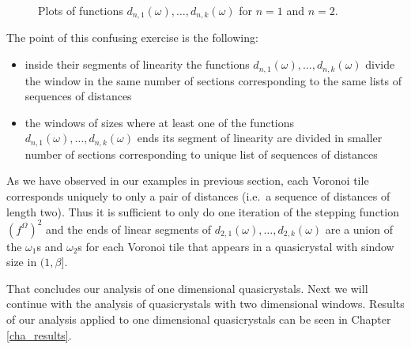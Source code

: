 \documentclass[text.tex]{subfiles}
\begin{document}
\begin{figure}[h!]
\caption{Plots of functions $d_{n,1}(\omega),\dots, d_{n,k}(\omega)$ for $n=1$ and $n=2$. }
\label{fig_steppingFunctionDiscontinuityFunctions}
\end{figure}


The point of this confusing exercise is the following: 
\begin{itemize}
\item inside their segments of linearity the functions $d_{n,1}(\omega),\dots, d_{n,k}(\omega)$ divide the window in the same number of sections corresponding to the same lists of sequences of distances 
\item the windows of sizes where at least one of the functions $d_{n,1}(\omega),\dots, d_{n,k}(\omega)$ ends its segment of linearity are divided in smaller number of sections corresponding to unique list of sequences of distances
\end{itemize} 

As we have observed in our examples in previous section, each Voronoi tile corresponds uniquely to only a pair of distances (i.e.\ a sequence of distances of length two). Thus it is sufficient to only do one iteration of the stepping function $(f^\Omega)^2$ and the ends of linear segments of $d_{2,1}(\omega),\dots, d_{2,k}(\omega)$ are a union of the $\omega_1$s and $\omega_2$s for each Voronoi tile that appears in a quasicrystal with sindow size in $(1,\beta]$. 

That concludes our analysis of one dimensional quasicrystals. Next we will continue with the analysis of quasicrystals with two dimensional windows. Results of our analysis applied to one dimensional quasicrystals can be seen in Chapter \ref{cha_results}. 
\end{document}

